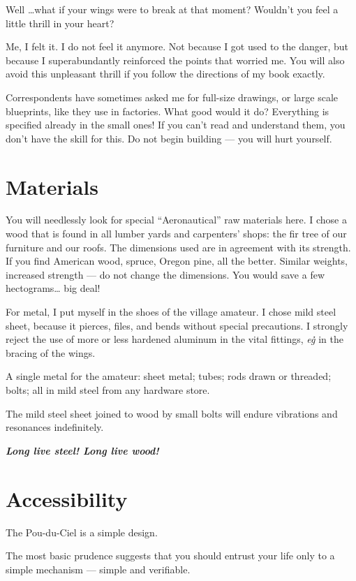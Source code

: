 \documentclass{book}
\begin{document}
Well \ldots what if your wings were to break at that moment?  Wouldn't
you feel a little thrill in your heart?

Me, I felt it. I do not feel it anymore. Not because I got used to the
danger, but because I superabundantly reinforced the points that
worried me. You will also avoid this unpleasant thrill if you follow
the directions of my book exactly.

Correspondents have sometimes asked me for full-size drawings, or
large scale blueprints, like they use in factories. What good would it
do?  Everything is specified already in the small ones! If you can't
read and understand them, you don't have the skill for this. Do not
begin building --- you will hurt yourself.

\section{Materials}

You will needlessly look for special ``Aeronautical'' raw materials
here. I chose a wood that is found in all lumber yards and carpenters'
shops: the fir tree of our furniture and our roofs. The dimensions
used are in agreement with its strength. If you find American wood,
spruce, Oregon pine, all the better. Similar weights, increased
strength --- do not change the dimensions. You would save a few
hectograms\ldots{} big deal!

For metal, I put myself in the shoes of the village amateur. I chose
mild steel sheet, because it pierces, files, and bends without special
precautions. I strongly reject the use of more or less hardened
aluminum in the vital fittings, \textit{e\.g\.} in the bracing of the
wings.

A single metal for the amateur: sheet metal; tubes; rods drawn or
threaded; bolts; all in mild steel from any hardware store.

The mild steel sheet joined to wood by small bolts will endure
vibrations and resonances indefinitely.

\textbf{\emph{Long live steel! Long live wood!}}

\section{Accessibility}

The Pou-du-Ciel is a simple design.

The most basic prudence suggests that you should entrust your life
only to a simple mechanism --- simple and verifiable.
\end{document}
